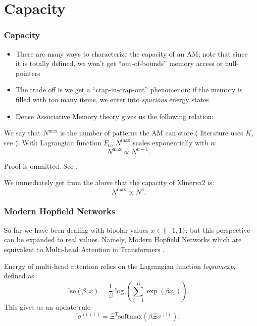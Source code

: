 \documentclass{beamer}
\begin{document}
\section{Capacity}
\begin{frame}
\frametitle{Capacity}

\begin{itemize}
    \item There are many ways to characterize the capacity of an AM; note that since
    it is totally defined, we won't get ``out-of-bounds'' memory access or null-pointers

    \item The trade off is we get a ``crap-in-crap-out'' phenomenon: if the memory
    is filled with too many items, we enter into \textit{spurious} energy states

    \item Dense Associative Memory theory gives us the following relation:
\end{itemize}
\begin{theorem}
    We say that $N^\text{max}$ is the number of patterns the AM can store (
        literature uses $K$, see \textcite{krotov_dense_2016}
    ). With Lagrangian function $F_n$, $N^\text{max}$ scales exponentially with
    $n$:
    $$
    N^\text{max} \propto N^{n-1}.
    $$
\end{theorem}
Proof is ommitted. See \textcites{krotov_dense_2016,demircigil_model_2017}.

\end{frame}

\begin{frame}
    \begin{lemma}
        We immediately get from the above that the capacity of \textsf{Minerva2}
        is:
        $$
        N^\text{max} \propto N^3.
        $$ 
    \end{lemma}
\end{frame}

\begin{frame}
\frametitle{Modern Hopfield Networks}

So far we have been dealing with bipolar values $x \in \{-1, 1\}$: but this
perspective can be expanded to real values. Namely, Modern Hopfield Networks
\parencite{ramsauer_hopfield_2021} which are equivalent to Multi-head Attention
in Transformers \parencite{vaswani_attention_2023}.

\begin{definition}
    Energy of multi-head attention relies on the Lagrangian function \textit{logsumexp},
    defined as:
    $$
    \text{lse} (\beta, x) = \frac{1}{\beta} \log \left( \sum^D_{i=1} \exp (\beta x_i)\right).
    $$
    This gives us an update rule
    $$
    \sigma^{(t+1)} = \Xi^T \text{softmax} \left(\beta \Xi \sigma^{(t)}\right).
    $$
\end{definition}
\end{frame}
\end{document}
